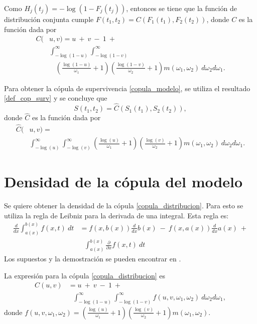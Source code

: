 \documentclass[11pt,a4paper]{article}
\begin{document}
\begin{appendices}
Como $H_j(t_j) = -\log (1-F_j(t_j))$, entonces se tiene que la función de distribución conjunta cumple $F(t_1, t_2) = C(F_1(t_1), F_2(t_2))$, donde $C$ es la función dada por
\begin{align*}
C(&u, v) = u \ + \ v \ - \ 1 \ + \nonumber \\
&\int_{-\log (1-u)}^\infty \int_{-\log (1-v)}^\infty\\
&\ \ \ \ \left( \frac{\log (1-u)}{\omega_1}+1 \right) \left( \frac{\log (1-v)}{\omega_2}+1\right) m(\omega_1, \omega_2) \ d\omega_2 d\omega_1.
\end{align*}

Para obtener la cópula de supervivencia \eqref{copula_modelo}, se utiliza el resultado \ref{def_cop_surv} y se concluye que $$S(t_1, t_2) = \widehat{C}(S_1(t_1), S_2(t_2)),$$ donde $\widehat{C}$ es la función dada por
\begin{align*}
\widehat{C}(&u, v) =\\
&\int_{-\log (u)}^\infty \int_{-\log (v)}^\infty \left( \frac{\log (u)}{\omega_1}+1 \right) \left( \frac{\log (v)}{\omega_2}+1\right) m(\omega_1, \omega_2) \ d\omega_2 d\omega_1.
\end{align*}

\newpage

\section{Densidad de la cópula del modelo}
\label{sec_densidad_copula_modelo}

Se quiere obtener la densidad de la cópula \eqref{copula_distribucion}. Para esto se utiliza la regla de Leibniz para la derivada de una integral. Esta regla es:
\begin{align}\label{regla_leibniz}
\frac{d}{dx} \int_{a(x)}^{b(x)} f(x, t) \ dt &= f(x, b(x)) \frac{d}{dx}b(x) \ - \ f(x, a(x))\frac{d}{dx}a(x) \ + \nonumber\\
&\ \ \ \int_{a(x)}^{b(x)}\frac{\partial}{\partial x} f(x, t) \ dt
\end{align}
Los supuestos y la demostración se pueden encontrar en \citet{flanders}.

La expresión para la cópula \eqref{copula_distribucion} es
\begin{align*}
C(u, v) &= u \ + \ v \ - \ 1 \ +\\ 
& \ \ \ \int_{-\log (1-u)}^\infty \int_{-\log (1-v)}^\infty f(u, v, \omega_1, \omega_2) \ d\omega_2 d\omega_1,
\end{align*}
donde $f(u, v, \omega_1, \omega_2) = \left( \frac{\log (u)}{\omega_1}+1 \right) \left( \frac{\log (v)}{\omega_2}+1\right) m(\omega_1, \omega_2)$.


\end{appendices}
\end{document}
